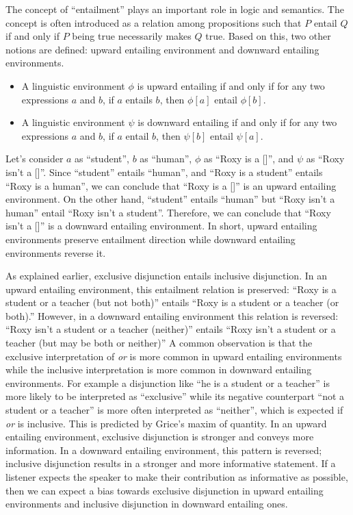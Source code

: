 \documentclass[oneside]{report}
\theoremstyle{definition}
\theoremstyle{definition}
\theoremstyle{definition}
\theoremstyle{remark}
\begin{document}
The concept of ``entailment'' plays an important role in logic and
semantics. The concept is often introduced as a relation among
propositions such that \(P\) entail \(Q\) if and only if \(P\) being
true necessarily makes \(Q\) true. Based on this, two other notions are
defined: upward entailing environment and downward entailing
environments.
\begin{itemize}
\item
  A linguistic environment \(\phi\) is upward entailing if and only if
  for any two expressions \(a\) and \(b\), if \(a\) entails \(b\), then
  \(\phi[a]\) entail \(\phi[b]\).
\item
  A linguistic environment \(\psi\) is downward entailing if and only if
  for any two expressions \(a\) and \(b\), if \(a\) entail \(b\), then
  \(\psi[b]\) entail \(\psi[a]\).
\end{itemize}
Let's consider \(a\) as ``student'', \(b\) as ``human'', \(\phi\) as
``Roxy is a {[}{]}'', and \(\psi\) as ``Roxy isn't a {[}{]}''. Since
``student'' entails ``human'', and ``Roxy is a student'' entails ``Roxy
is a human'', we can conclude that ``Roxy is a {[}{]}'' is an upward
entailing environment. On the other hand, ``student'' entails ``human''
but ``Roxy isn't a human'' entail ``Roxy isn't a student''. Therefore,
we can conclude that ``Roxy isn't a {[}{]}'' is a downward entailing
environment. In short, upward entailing environments preserve entailment
direction while downward entailing environments reverse it.

As explained earlier, exclusive disjunction entails inclusive
disjunction. In an upward entailing environment, this entailment
relation is preserved: ``Roxy is a student or a teacher (but not both)''
entails ``Roxy is a student or a teacher (or both).'' However, in a
downward entailing environment this relation is reversed: ``Roxy isn't a
student or a teacher (neither)'' entails ``Roxy isn't a student or a
teacher (but may be both or neither)'' A common observation is that the
exclusive interpretation of \emph{or} is more common in upward entailing
environments while the inclusive interpretation is more common in
downward entailing environments. For example a disjunction like ``he is
a student or a teacher'' is more likely to be interpreted as
``exclusive'' while its negative counterpart ``not a student or a
teacher'' is more often interpreted as ``neither'', which is expected if
\emph{or} is inclusive. This is predicted by Grice's maxim of quantity.
In an upward entailing environment, exclusive disjunction is stronger
and conveys more information. In a downward entailing environment, this
pattern is reversed; inclusive disjunction results in a stronger and
more informative statement. If a listener expects the speaker to make
their contribution as informative as possible, then we can expect a bias
towards exclusive disjunction in upward entailing environments and
inclusive disjunction in downward entailing ones.
\end{document}
